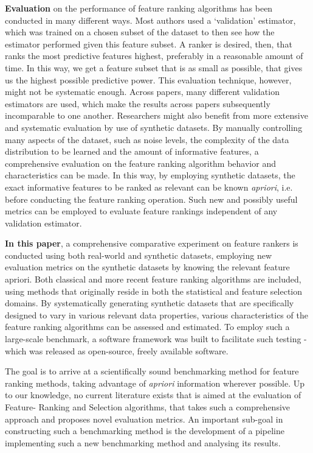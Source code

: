 \documentclass[../main.tex]{subfiles}
\begin{document}
\textbf{Evaluation} on the performance of feature ranking algorithms has been conducted in many different ways. Most authors used a `validation' estimator, which was trained on a chosen subset of the dataset to then see how the estimator performed given this feature subset. A ranker is desired, then, that ranks the most predictive features highest, preferably in a reasonable amount of time. In this way, we get a feature subset that is as small as possible, that gives us the highest possible predictive power. This evaluation technique, however, might not be systematic enough. Across papers, many different validation estimators are used, which make the results across papers subsequently incomparable to one another. Researchers might also benefit from more extensive and systematic evaluation by use of synthetic datasets. By manually controlling many aspects of the dataset, such as noise levels, the complexity of the data distribution to be learned and the amount of informative features, a comprehensive evaluation on the feature ranking algorithm behavior and characteristics can be made. In this way, by employing synthetic datasets, the exact informative features to be ranked as relevant can be known \textit{\gls{apriori}}, i.e. before conducting the feature ranking operation. Such new and possibly useful metrics can be employed to evaluate feature rankings independent of any validation estimator.



\textbf{In this paper}, a comprehensive comparative experiment on feature rankers is conducted using both real-world and synthetic datasets, employing new evaluation metrics on the synthetic datasets by knowing the relevant feature apriori. Both classical and more recent feature ranking algorithms are included, using methods that originally reside in both the statistical and feature selection domains. By systematically generating synthetic datasets that are specifically designed to vary in various relevant data properties, various characteristics of the feature ranking algorithms can be assessed and estimated. To employ such a large-scale benchmark, a software framework was built to facilitate such testing - which was released as open-source, freely available software.

The goal is to arrive at a scientifically sound benchmarking method for feature ranking methods, taking advantage of \textit{\gls{apriori}} information wherever possible. Up to our knowledge, no current literature exists that is aimed at the evaluation of Feature- Ranking and Selection algorithms, that takes such a comprehensive approach and proposes novel evaluation metrics. An important sub-goal in constructing such a benchmarking method is the development of a pipeline implementing such a new benchmarking method and analysing its results.
\end{document}

